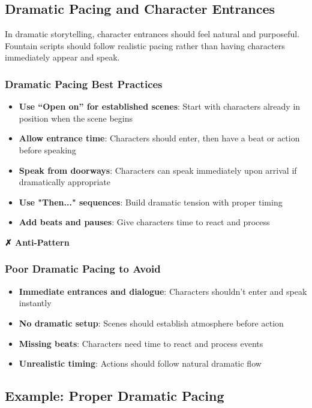 \documentclass[11pt,letterpaper,oldstylefigures]{memoir}
\newenvironment{AntiPattern}
{\begingroup
\small
\setlength{\parindent}{0pt}
\setlength{\parskip}{0.5em}
\allowdisplaybreaks
\setlength{\displaywidowpenalty}{0}
\setlength{\widowpenalty}{0}
\setlength{\clubpenalty}{0}
\setlength{\interlinepenalty}{0}
\begin{tcolorbox}[
    colback=red!5,
    colframe=red!75!black,
    boxrule=0.5pt,
    arc=2pt,
    left=0.5em,
    right=0.5em,
    top=0.25em,
    bottom=0.25em
]
\textbf{✗ Anti-Pattern}
\end{tcolorbox}\par
}
{\endgroup}
\begin{document}
\subsection{Dramatic Pacing and Character Entrances}

In dramatic storytelling, character entrances should feel natural and purposeful. Fountain scripts should follow realistic pacing rather than having characters immediately appear and speak.

\subsubsection{Dramatic Pacing Best Practices}
\begin{itemize}
\item \textbf{Use ``Open on'' for established scenes}: Start with characters already in position when the scene begins
\item \textbf{Allow entrance time}: Characters should enter, then have a beat or action before speaking
\item \textbf{Speak from doorways}: Characters can speak immediately upon arrival if dramatically appropriate
\item \textbf{Use "Then..." sequences}: Build dramatic tension with proper timing
\item \textbf{Add beats and pauses}: Give characters time to react and process
\end{itemize}


\begin{AntiPattern}
\subsubsection{Poor Dramatic Pacing to Avoid}
\begin{itemize}
\item \textbf{Immediate entrances and dialogue}: Characters shouldn't enter and speak instantly
\item \textbf{No dramatic setup}: Scenes should establish atmosphere before action
\item \textbf{Missing beats}: Characters need time to react and process events
\item \textbf{Unrealistic timing}: Actions should follow natural dramatic flow
\end{itemize}
\end{AntiPattern}

\subsection{Example: Proper Dramatic Pacing}
\end{document}
